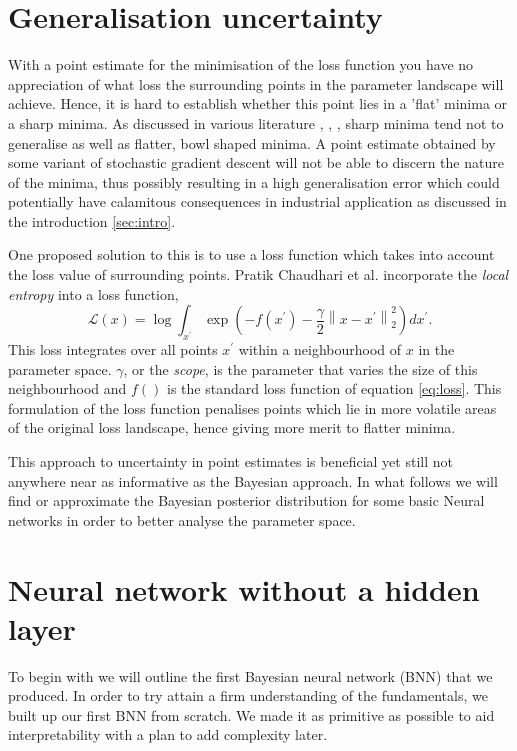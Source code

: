 \documentclass[review]{siamart190516}
\begin{document}
\section{Generalisation uncertainty} \label{sec:gen_error}
With a point estimate for the minimisation of the loss function you have no appreciation of what loss the surrounding points in the parameter landscape will achieve. Hence, it is hard to establish whether this point lies in a 'flat' minima or a sharp minima. As discussed in various literature \cite{Tom}, \cite{Sepp}, \cite{Nitish}, sharp minima tend not to generalise as well as flatter, bowl shaped minima. A point estimate obtained by some variant of stochastic gradient descent will not be able to discern the nature of the minima, thus possibly resulting in a high generalisation error which could potentially have calamitous consequences in industrial application as discussed in the introduction \ref{sec:intro}.

One proposed solution to this is to use a loss function which takes into account the loss value of surrounding points. Pratik Chaudhari et al.\cite{Pratik} incorporate the \textit{local entropy} into a loss function, 
\begin{equation}
\mathcal{L}(x) = \log \int_{x^{\prime}} \exp \left(-f\left(x^{\prime}\right)-\frac{\gamma}{2}\left\|x-x^{\prime}\right\|_{2}^{2}\right) d x^{\prime}.
\label{local entropy loss_function}
\end{equation}
This loss integrates over all points $x^{\prime}$ within a neighbourhood of $x$ in the parameter space. $\gamma$, or the \emph{scope}, is the parameter that varies the size of this neighbourhood and $f()$ is the standard loss function of equation \ref{eq:loss}.
This formulation of the loss function penalises points which lie in more volatile areas of the original loss landscape, hence giving more merit to flatter minima.

This approach to uncertainty in point estimates is beneficial yet still not anywhere near as informative as the Bayesian approach. In what follows we will find or approximate the Bayesian posterior distribution for some basic Neural networks in order to better analyse the parameter space.

\section{Neural network without a hidden layer} \label{proto_bnn}
To begin with we will outline the first Bayesian neural network (BNN) that we produced. In order to try attain a firm understanding of the fundamentals, we built up our first BNN from scratch. We made it as primitive as possible to aid interpretability with a plan to add complexity later.
\end{document}
